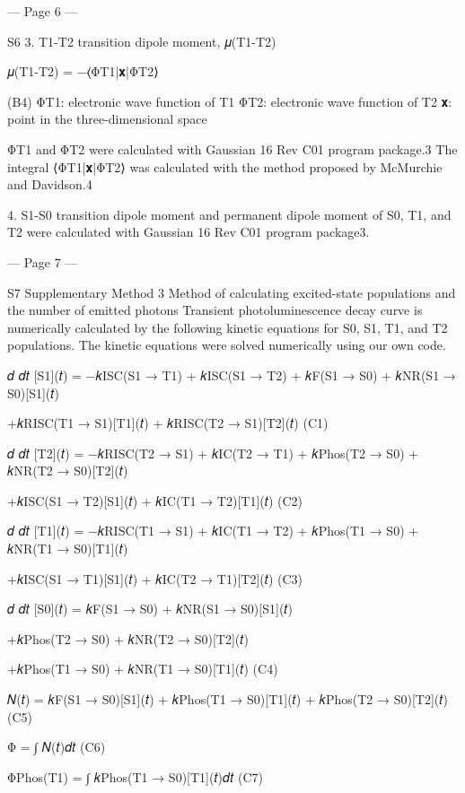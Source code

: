  
 


--- Page 6 ---
 
S6 
3. T1-T2 transition dipole moment, 𝜇(T1-T2) 
 
𝜇(T1-T2) = −⟨ΦT1|𝐱|ΦT2⟩ 
 
(B4) 
ΦT1: electronic wave function of T1 
ΦT2: electronic wave function of T2 
𝐱: point in the three-dimensional space 
 
ΦT1 and ΦT2 were calculated with Gaussian 16 Rev C01 program package.3 The integral 
⟨ΦT1|𝐱|ΦT2⟩ was calculated with the method proposed by McMurchie and Davidson.4 
 
4. S1-S0 transition dipole moment and permanent dipole moment of S0, T1, and T2 were 
calculated with Gaussian 16 Rev C01 program package3. 
 


--- Page 7 ---
 
S7 
Supplementary Method 3 
Method of calculating excited-state populations and the number of emitted photons 
Transient photoluminescence decay curve is numerically calculated by the following kinetic 
equations for S0, S1, T1, and T2 populations. The kinetic equations were solved numerically 
using our own code. 
 
𝑑
𝑑𝑡 [S1](𝑡) = −{𝑘ISC(S1 → T1) + 𝑘ISC(S1 → T2) + 𝑘F(S1 → S0) + 𝑘NR(S1 → S0)}[S1](𝑡) 
 
 
                        +𝑘RISC(T1 → S1)[T1](𝑡) + 𝑘RISC(T2 → S1)[T2](𝑡) 
(C1) 
 
𝑑
𝑑𝑡 [T2](𝑡) = −{𝑘RISC(T2 → S1) + 𝑘IC(T2 → T1) + 𝑘Phos(T2 → S0) + 𝑘NR(T2 → S0)}[T2](𝑡) 
 
 
                        +𝑘ISC(S1 → T2)[S1](𝑡) + 𝑘IC(T1 → T2)[T1](𝑡) 
(C2) 
 
𝑑
𝑑𝑡 [T1](𝑡) = −{𝑘RISC(T1 → S1) + 𝑘IC(T1 → T2) + 𝑘Phos(T1 → S0) + 𝑘NR(T1 → S0)}[T1](𝑡) 
 
 
                         +𝑘ISC(S1 → T1)[S1](𝑡) + 𝑘IC(T2 → T1)[T2](𝑡) 
(C3) 
 
𝑑
𝑑𝑡 [S0](𝑡) = {𝑘F(S1 → S0) + 𝑘NR(S1 → S0)}[S1](𝑡) 
 
 
                        +{𝑘Phos(T2 → S0) + 𝑘NR(T2 → S0)}[T2](𝑡) 
 
 
                        +{𝑘Phos(T1 → S0) + 𝑘NR(T1 → S0)}[T1](𝑡) 
(C4) 
 
𝑁(𝑡) = {𝑘F(S1 → S0)[S1](𝑡) + 𝑘Phos(T1 → S0)[T1](𝑡) + 𝑘Phos(T2 → S0)[T2](𝑡)} 
(C5) 
 
Φ = ∫ 𝑁(𝑡)𝑑𝑡 
(C6) 
 
ΦPhos(T1) = ∫ 𝑘Phos(T1 → S0)[T1](𝑡)𝑑𝑡 
(C7) 
 
